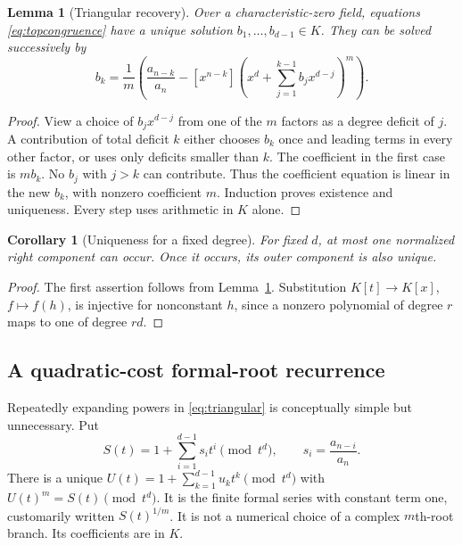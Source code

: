 \documentclass[11pt,a4paper]{article}
\numberwithin{equation}{section}
\newtheorem{lemma}[theorem]{Lemma}
\newtheorem{corollary}[theorem]{Corollary}
\theoremstyle{definition}
\theoremstyle{remark}
\begin{document}
\begin{lemma}[Triangular recovery]
\label{lem:triangular}
Over a characteristic-zero field, equations \eqref{eq:topcongruence} have a
unique solution $b_1,\ldots,b_{d-1}\in K$. They can be solved successively by
\begin{equation}
 b_k=\frac1m\left(\frac{a_{n-k}}{a_n}-
 [x^{n-k}]\left(x^d+\sum_{j=1}^{k-1}b_jx^{d-j}\right)^m\right).
 \label{eq:triangular}
\end{equation}
\end{lemma}
\begin{proof}
View a choice of $b_jx^{d-j}$ from one of the $m$ factors as a degree deficit
of $j$. A contribution of total deficit $k$ either chooses $b_k$ once and
leading terms in every other factor, or uses only deficits smaller than $k$.
The coefficient in the first case is $mb_k$. No $b_j$ with $j>k$ can contribute.
Thus the coefficient equation is linear in the new $b_k$, with nonzero
coefficient $m$. Induction proves existence and uniqueness. Every step uses
arithmetic in $K$ alone.
\end{proof}

\begin{corollary}[Uniqueness for a fixed degree]
\label{cor:unique}
For fixed $d$, at most one normalized right component can occur. Once it
occurs, its outer component is also unique.
\end{corollary}
\begin{proof}
The first assertion follows from Lemma~\ref{lem:triangular}. Substitution
$K[t]\to K[x]$, $f\mapsto f(h)$, is injective for nonconstant $h$, since a
nonzero polynomial of degree $r$ maps to one of degree $rd$.
\end{proof}

\subsection{A quadratic-cost formal-root recurrence}
Repeatedly expanding powers in \eqref{eq:triangular} is conceptually simple
but unnecessary. Put
\begin{equation}
 S(t)=1+\sum_{i=1}^{d-1}s_i t^i\pmod{t^d},
 \qquad s_i=\frac{a_{n-i}}{a_n}.
 \label{eq:S}
\end{equation}
There is a unique $U(t)=1+\sum_{k=1}^{d-1}u_k t^k\pmod{t^d}$ with
$U(t)^m=S(t)\pmod{t^d}$. It is the finite formal series with constant term
one, customarily written $S(t)^{1/m}$. It is not a numerical choice of a
complex $m$th-root branch. Its coefficients are in $K$.
\end{document}
